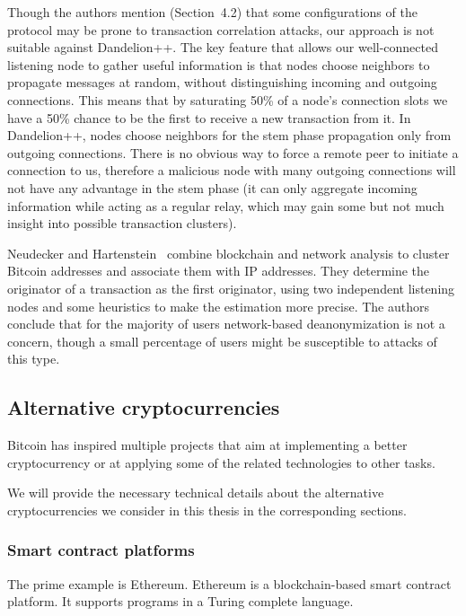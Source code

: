 Though the authors mention (Section~4.2) that some configurations of the protocol may be prone to transaction  correlation attacks, our approach is not suitable against Dandelion++.
The key feature that allows our well-connected listening node to gather useful information is that nodes choose neighbors to propagate messages at random, without distinguishing incoming and outgoing connections.
This means that by saturating 50\% of a node's connection slots we have a 50\% chance to be the first to receive a new transaction from it.
In Dandelion++, nodes choose neighbors for the stem phase propagation only from outgoing connections.
There is no obvious way to force a remote peer to initiate a connection to us, therefore a malicious node with many outgoing connections will not have any advantage in the stem phase (it can only aggregate incoming information while acting as a regular relay, which may gain some but not much insight into possible transaction clusters).

Neudecker and Hartenstein~\cite{Neudecker2017} combine blockchain and network analysis to cluster Bitcoin addresses and associate them with IP addresses.
They determine the originator of a transaction as the first originator, using two independent listening nodes and some heuristics to make the estimation more precise.
The authors conclude that for the majority of users network-based deanonymization is not a concern, though a small percentage of users might be susceptible to attacks of this type.


\subsection{Alternative cryptocurrencies}

Bitcoin has inspired multiple projects that aim at implementing a better cryptocurrency or at applying some of the related technologies to other tasks.

We will provide the necessary technical details about the alternative cryptocurrencies we consider in this thesis in the corresponding sections.

\subsubsection*{Smart contract platforms}

The prime example is Ethereum.
Ethereum is a blockchain-based smart contract platform.
It supports programs in a Turing complete language.

